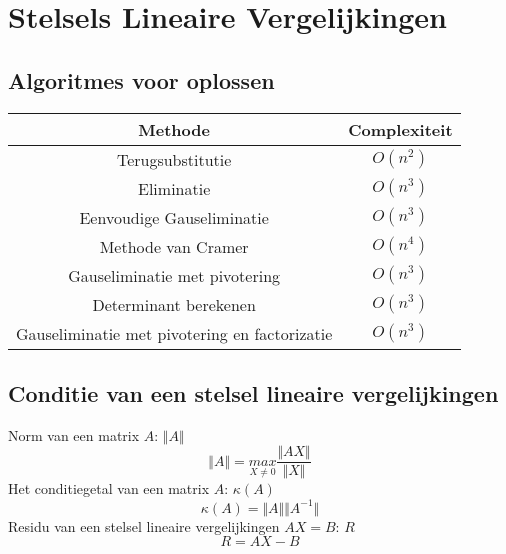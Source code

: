 \documentclass[samenvatting.tex]{subfiles}
\begin{document}
\chapter{Stelsels Lineaire Vergelijkingen}

\section{Algoritmes voor oplossen}
\begin{center}
\begin{tabular}{|c|c|}
\hline
Methode & Complexiteit\\
\hline
Terugsubstitutie & $O(n^2)$\\
Eliminatie & $O(n^3)$\\
Eenvoudige Gauseliminatie & $O(n^3)$\\
Methode van Cramer & $O(n^4)$\\
Gauseliminatie met pivotering & $O(n^3)$\\
Determinant berekenen & $O(n^3)$\\
Gauseliminatie met pivotering en factorizatie & $O(n^3)$\\

\hline
\end{tabular}
\end{center}

\section{Conditie van een stelsel lineaire vergelijkingen}
Norm van een matrix $A$: $\Vert A \Vert$
\[
\Vert A \Vert = \underset{X \neq 0}{max}\frac{\Vert AX \Vert}{\Vert X \Vert}
\]
Het conditiegetal van een matrix $A$: $\kappa(A)$
\[
\kappa(A) = \Vert A \Vert \Vert A^{-1} \Vert
\]
Residu van een stelsel lineaire vergelijkingen $AX=B$: $R$
\[
R = AX - B
\]
\end{document}
